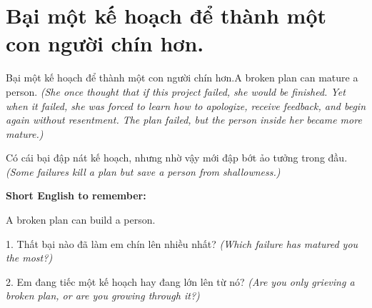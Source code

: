 \section{Bại một kế hoạch để thành một con người chín hơn.}
\begin{truyen}{Bại một kế hoạch để thành một con người chín hơn.}{A broken plan can mature a person.}
\textit{(She once thought that if this project failed, she would be finished. Yet when it failed, she was forced to learn how to apologize, receive feedback, and begin again without resentment. The plan failed, but the person inside her became more mature.)}
\end{truyen}
\begin{baihoc}
Có cái bại đập nát kế hoạch, nhưng nhờ vậy mới đập bớt ảo tưởng trong đầu.
\textit{(Some failures kill a plan but save a person from shallowness.)}
\end{baihoc}
\begin{ghinhoanh}
\textbf{Short English to remember:}

A broken plan can build a person.
\end{ghinhoanh}
\begin{tuhocnhanh}
1. Thất bại nào đã làm em chín lên nhiều nhất? \textit{(Which failure has matured you the most?)}

2. Em đang tiếc một kế hoạch hay đang lớn lên từ nó? \textit{(Are you only grieving a broken plan, or are you growing through it?)}
\end{tuhocnhanh}
\ngancach
